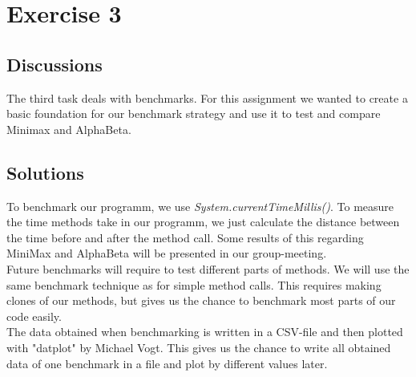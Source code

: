\section{Exercise 3}
\subsection{Discussions}
The third task deals with benchmarks. For this assignment we wanted to create a basic foundation for our benchmark strategy and use it to test and compare Minimax and AlphaBeta. 
\subsection{Solutions}
To benchmark our programm, we use \textit{System.currentTimeMillis()}. To measure the time methods take in our programm, we just calculate the distance between the time before and after the method call. Some results of this regarding MiniMax and AlphaBeta will be presented in our group-meeting.\\
Future benchmarks will require to test different parts of methods. We will use the same benchmark technique as for simple method calls. This requires making clones of our methods, but gives us the chance to benchmark most parts of our code easily.\\
The data obtained when benchmarking is written in a CSV-file and then plotted with "datplot" by Michael Vogt. This gives us the chance to write all obtained data of one benchmark in a file and plot by different values later.

